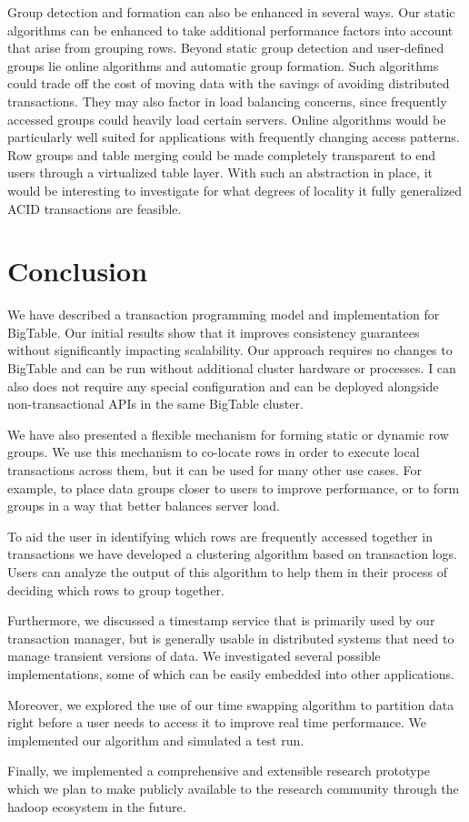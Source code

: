 \documentclass[10pt,final,journal]{IEEEtran}
\begin{document}
Group detection and formation can also be enhanced in several ways. Our static algorithms can be enhanced to take additional performance factors into account that arise from grouping rows. Beyond static group detection and user-defined groups lie online algorithms and automatic group formation. Such algorithms could trade off the cost of moving data with the savings of avoiding distributed transactions. They may also factor in load balancing concerns, since frequently accessed groups could heavily load certain servers. Online algorithms would be particularly well suited for applications with frequently changing access patterns. Row groups and table merging could be made completely transparent to end users through a virtualized table layer. With such an abstraction in place, it would be interesting to investigate for what degrees of locality it fully generalized ACID transactions are feasible.

\section{Conclusion}
We have described a transaction programming model and implementation for BigTable. Our initial results show that it improves consistency guarantees without significantly impacting scalability. Our approach requires no changes to BigTable and can be run without additional cluster hardware or processes. I can also does not require any special configuration and can be deployed alongside non-transactional APIs in the same BigTable cluster.

We have also presented a flexible mechanism for forming static or dynamic row groups. We use this mechanism to co-locate rows in order to execute local transactions across them, but it can be used for many other use cases. For example, to place data groups closer to users to improve performance, or to form groups in a way that better balances server load.

To aid the user in identifying which rows are frequently accessed together in transactions we have developed a clustering algorithm based on transaction logs. Users can analyze the output of this algorithm to help them in their process of deciding which rows to group together.

Furthermore, we discussed a timestamp service that is primarily used by our transaction manager, but is generally usable in distributed systems that need to manage transient versions of data. We investigated several possible implementations, some of which can be easily embedded into other applications.

Moreover, we explored the use of our time swapping algorithm to partition data right before a user needs to access it to improve real time performance.
We implemented our algorithm and simulated a test run.

Finally, we implemented a comprehensive and extensible research prototype which we plan to make publicly available to the research community through the hadoop ecosystem in the future.




\end{document}

